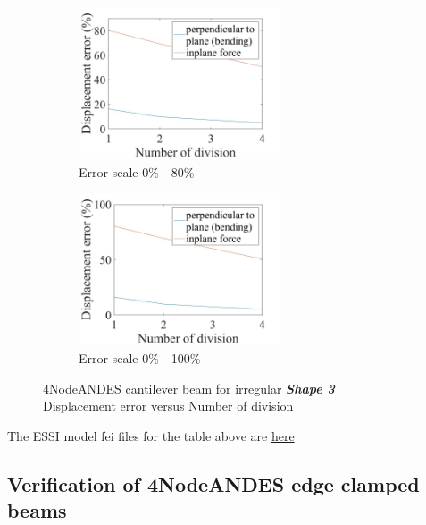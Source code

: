 \documentclass[fleqn,11pt,letter]{article}
\begin{document}
\begin{figure}[H]
  \begin{subfigure}{0.5\textwidth}
    \centering
    \includegraphics[width=6cm]{../Figure_files/4NodeANDES/error4andes_beam_irregular_shape3.jpeg}
    \caption{Error scale 0\% - 80\%}
  \end{subfigure}
  \begin{subfigure}{0.5\textwidth}
    \centering
    \includegraphics[width=6cm]{../Figure_files/4NodeANDES/error4andes_beam_irregular_shape3100.jpeg}
    \caption{Error scale 0\% - 100\%}
  \end{subfigure}
  \captionsetup{justification=centering,margin=2cm}
  \caption{4NodeANDES cantilever beam for irregular \emph{\textbf{Shape 3}}\\
      Displacement error   versus   Number of division}
  \label{fig shape 3 4NodeANDES cantilever beam for irregular more elements}
\end{figure}


The ESSI model fei files for the table above are \href{https://github.com/yuan-energy/ESSI_Verification/blob/master/4NodeANDES/cantilever_irregular_element_cut/cantilever_irregular_element_cut.tar.gz?raw=true}{here}












\newpage
\subsection{Verification of 4NodeANDES edge clamped beams }
\end{document}
